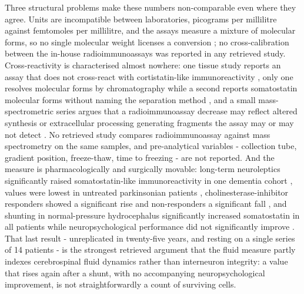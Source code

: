 \documentclass[11pt]{article}
\begin{document}
Three structural problems make these numbers non-comparable even where they agree. Units are incompatible between laboratories, picograms per millilitre against femtomoles per millilitre, and the assays measure a mixture of molecular forms, so no single molecular weight licenses a conversion \citep{Atack1988,Serby1984,Strittmatter1996b}; no cross-calibration between the in-house radioimmunoassays was reported in any retrieved study. Cross-reactivity is characterised almost nowhere: one tissue study reports an assay that does not cross-react with cortistatin-like immunoreactivity \citep{Grouselle1998}, only one resolves molecular forms by chromatography \citep{Strittmatter1997} while a second reports somatostatin molecular forms without naming the separation method \citep{Strittmatter1996b}, and a small mass-spectrometric series argues that a radioimmunoassay decrease may reflect altered synthesis or extracellular processing generating fragments the assay may or may not detect \citep{Nilsson2001}. No retrieved study compares radioimmunoassay against mass spectrometry on the same samples, and pre-analytical variables - collection tube, gradient position, freeze-thaw, time to freezing - are not reported. And the measure is pharmacologically and surgically movable: long-term neuroleptics significantly raised somatostatin-like immunoreactivity in one dementia cohort \citep{Strittmatter1997}, values were lowest in untreated parkinsonian patients \citep{Masson1990}, cholinesterase-inhibitor responders showed a significant rise and non-responders a significant fall \citep{Alhainen1991}, and shunting in normal-pressure hydrocephalus significantly increased somatostatin in all patients while neuropsychological performance did not significantly improve \citep{Poca2001}. That last result - unreplicated in twenty-five years, and resting on a single series of 14 patients - is the strongest retrieved argument that the fluid measure partly indexes cerebrospinal fluid dynamics rather than interneuron integrity: a value that rises again after a shunt, with no accompanying neuropsychological improvement, is not straightforwardly a count of surviving cells.
\end{document}
